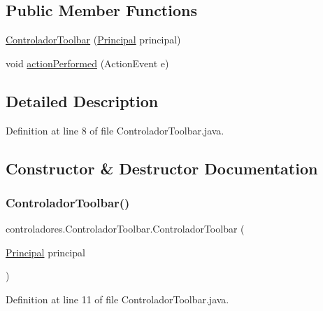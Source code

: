 \subsection*{Public Member Functions}
\begin{DoxyCompactItemize}
\item 
\mbox{\hyperlink{classcontroladores_1_1_controlador_toolbar_a7186864bd3fd61279fc13c4566d86cc3}{Controlador\+Toolbar}} (\mbox{\hyperlink{classvistas_1_1_principal}{Principal}} principal)
\item 
void \mbox{\hyperlink{classcontroladores_1_1_controlador_toolbar_a21d7012349c1f101be2d87495da85fa6}{action\+Performed}} (Action\+Event e)
\end{DoxyCompactItemize}


\subsection{Detailed Description}


Definition at line 8 of file Controlador\+Toolbar.\+java.



\subsection{Constructor \& Destructor Documentation}
\mbox{\label{classcontroladores_1_1_controlador_toolbar_a7186864bd3fd61279fc13c4566d86cc3}} 
\subsubsection{\texorpdfstring{Controlador\+Toolbar()}{ControladorToolbar()}}
{\footnotesize\ttfamily controladores.\+Controlador\+Toolbar.\+Controlador\+Toolbar (\begin{DoxyParamCaption}\item[{\mbox{\hyperlink{classvistas_1_1_principal}{Principal}}}]{principal }\end{DoxyParamCaption})}



Definition at line 11 of file Controlador\+Toolbar.\+java.



